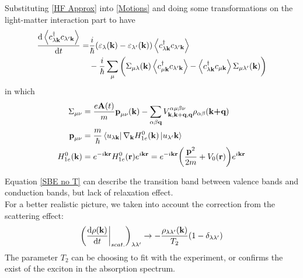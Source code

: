 \documentclass{beamer}
\begin{document}
\begin{frame}
	Substituting \eqref{HF Approx} into \eqref{Motions} and doing some transformations on the light-matter interaction part to have
\begin{align}
\label{SBE no T}
\dv{\ev{c^{\dagger}_{\lambda\textbf{k}} c_{\lambda'\textbf{k}}}}{t} = &\frac{i}{\hbar} (\varepsilon_{\lambda}(\textbf{k}) - \varepsilon_{\lambda'}(\textbf{k}))\ev{c^{\dagger}_{\lambda\textbf{k}} c_{\lambda'\textbf{k}}}\nonumber\\
&-\frac{i}{\hbar} \sum_{\mu}\bigg(\Sigma_{\mu \lambda}(\textbf{k}) \ev{c^{\dagger}_{\mu\textbf{k}} c_{\lambda'\textbf{k}}} - \ev{c^{\dagger}_{\lambda\textbf{k}} c_{\mu\textbf{k}}} \Sigma_{\mu \lambda'}(\textbf{k})\bigg)
\end{align}
in which
\begin{align}
	\Sigma_{\mu\nu} &= \frac{e\textbf{A}(t)}{m}\textbf{p}_{\mu\nu}(\textbf{k}) - \sum_{\alpha\beta\textbf{q}} V^{\alpha \mu \beta \nu}_{\textbf{k},\textbf{k}+\textbf{q},\textbf{q}}\rho_{\alpha \beta}(\textbf{k+q})\\
	\textbf{p}_{\mu \nu} &= \frac{m}{\hbar}\bra{u_{\lambda \textbf{k}}}\nabla_{\textbf{k}}H^0_{1e}(\textbf{k})\ket{u_{\lambda'}\textbf{k}}\\
	H^0_{1e}(\textbf{k}) &= e^{-i\textbf{k}\textbf{r}} H^0_{1e}(\textbf{r})e^{i\textbf{k}\textbf{r}} = e^{-i\textbf{k}\textbf{r}} \bigg(\frac{\textbf{p}^2}{2m} +V_0(\textbf{r})\bigg)e^{i\textbf{k}\textbf{r}}
\end{align}
\end{frame}
\begin{frame}
Equation \eqref{SBE no T} can describe the transition band between valence bands and conduction bands, but lack of relaxation effect.\\\null
\quad For a better realistic picture, we taken into account the correction from the scattering effect:
\begin{equation}
	\bigg(\dv{\rho(\textbf{k})}{t}\bigg|_{scat.}\bigg)_{\lambda\lambda'} \to - \frac{\rho_{\lambda\lambda'}(\textbf{k})}{T_2}(1-\delta_{\lambda\lambda'})
\end{equation}
\quad The parameter \(T_2\) can be choosing to fit with the experiment, or confirms the exist of the exciton in the absorption spectrum.
\end{frame}
\end{document}
